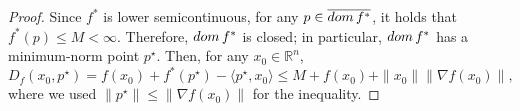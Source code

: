\documentclass[10pt,a4paper]{amsart}
\newcommand{\RR}{{\mathbb{R}}}
\newcommand{\dom}{\mathop{\rm dom}}
\begin{document}
\begin{proof}
    Since $f^\ast$ is lower semicontinuous, for any $p \in \overline{\dom f^\ast}$, it holds that $f^\ast(p) \le M < \infty$.
    Therefore, $\dom f^\ast$ is closed; in particular, $\dom f^\ast$ has a minimum-norm point $p^\star$.
    Then, for any $x_0 \in \RR^n$,
    \[
        D_f(x_0, p^\star) = f(x_0) + f^\ast(p^\star) - \langle p^\star, x_0\rangle \le M + f(x_0) + \|x_0\|\|\nabla f(x_0)\|,
    \]
    where we used $\|p^\star\| \le \|\nabla f(x_0)\|$ for the inequality.
\end{proof}
\end{document}

